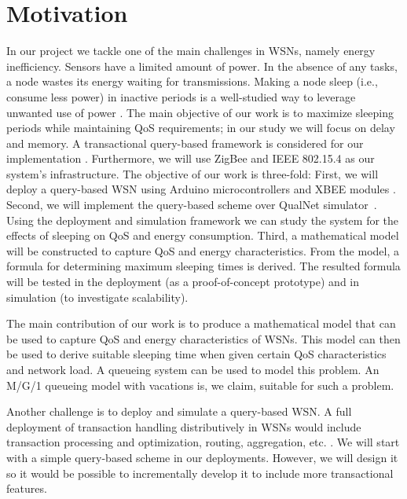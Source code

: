 \section{Motivation} \label{sec:motivation}


In our project we tackle one of the main challenges in WSNs, namely energy inefficiency. Sensors have a limited amount of power. In the absence of any tasks, a node wastes its energy waiting for transmissions. Making a node sleep (i.e., consume less power) in inactive periods is a well-studied way to leverage unwanted use of power \cite{1}. The main objective of our work is to maximize sleeping periods while maintaining QoS requirements; in our study we will focus on delay and memory. A transactional query-based framework is considered for our implementation \cite{2}. Furthermore, we will use ZigBee and IEEE 802.15.4 \cite{3} as our system's infrastructure. The objective of our work is three-fold: First, we will deploy a query-based WSN using Arduino microcontrollers \cite{17} and XBEE modules \cite{18}. Second, we will implement the query-based scheme over QualNet simulator~\cite{16}. Using the deployment and simulation framework we can study the system for the effects of sleeping on QoS and energy consumption. Third, a mathematical model will be constructed to capture QoS and energy characteristics. From the model, a formula for determining maximum sleeping times is derived. The resulted formula will be tested in the deployment (as a proof-of-concept prototype) and in simulation (to investigate scalability).

The main contribution of our work is to produce a mathematical model that can be used to capture QoS and energy characteristics of WSNs. This model can then be used to derive suitable sleeping time when given certain QoS characteristics and network load. A queueing system \cite{21} can be used to model this problem. An M/G/1 queueing model with vacations \cite{20} is, we claim, suitable for such a problem.

Another challenge is to deploy and simulate a query-based WSN. A full deployment of transaction handling distributively in WSNs would include transaction processing and optimization, routing, aggregation, etc. \cite{2}. We will start with a simple query-based scheme in our deployments. However, we will design it so it would be possible to incrementally develop it to include more transactional features. 
